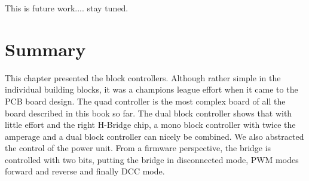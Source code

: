 \FloatBarrier


This is future work.... stay tuned.

\section{Summary}

This chapter presented the block controllers. Although rather simple in the individual building blocks, it was a champions league effort when it came to the PCB board design. The quad controller is the most complex board of all the board described in this book so far. The dual block controller shows that with little effort and the right H-Bridge chip, a mono block controller with twice the amperage and a dual block controller can nicely be combined. We also abstracted the control of the power unit. From a firmware perspective, the bridge is controlled with two bits, putting the bridge in disconnected mode, PWM modes forward and reverse and finally DCC mode.

